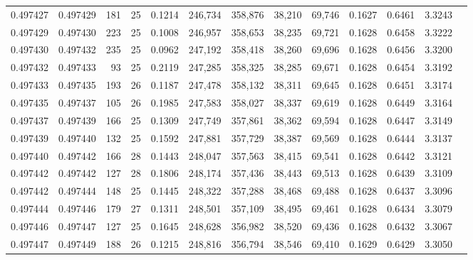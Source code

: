 \begin{tabular}{rrrrrrrrrrrrr}
0.497427 & 0.497429 & 181 &  25 &                                     0.1214 & 246,734 & 358,876 &  38,210 &  69,746 & 0.1627 & 0.6461 & 3.3243 \\
0.497429 & 0.497430 & 223 &  25 &                                     0.1008 & 246,957 & 358,653 &  38,235 &  69,721 & 0.1628 & 0.6458 & 3.3222 \\
0.497430 & 0.497432 & 235 &  25 &                                     0.0962 & 247,192 & 358,418 &  38,260 &  69,696 & 0.1628 & 0.6456 & 3.3200 \\
0.497432 & 0.497433 &  93 &  25 &                                     0.2119 & 247,285 & 358,325 &  38,285 &  69,671 & 0.1628 & 0.6454 & 3.3192 \\
0.497433 & 0.497435 & 193 &  26 &                                     0.1187 & 247,478 & 358,132 &  38,311 &  69,645 & 0.1628 & 0.6451 & 3.3174 \\
0.497435 & 0.497437 & 105 &  26 &                                     0.1985 & 247,583 & 358,027 &  38,337 &  69,619 & 0.1628 & 0.6449 & 3.3164 \\
0.497437 & 0.497439 & 166 &  25 &                                     0.1309 & 247,749 & 357,861 &  38,362 &  69,594 & 0.1628 & 0.6447 & 3.3149 \\
0.497439 & 0.497440 & 132 &  25 &                                     0.1592 & 247,881 & 357,729 &  38,387 &  69,569 & 0.1628 & 0.6444 & 3.3137 \\
0.497440 & 0.497442 & 166 &  28 &                                     0.1443 & 248,047 & 357,563 &  38,415 &  69,541 & 0.1628 & 0.6442 & 3.3121 \\
0.497442 & 0.497442 & 127 &  28 &                                     0.1806 & 248,174 & 357,436 &  38,443 &  69,513 & 0.1628 & 0.6439 & 3.3109 \\
0.497442 & 0.497444 & 148 &  25 &                                     0.1445 & 248,322 & 357,288 &  38,468 &  69,488 & 0.1628 & 0.6437 & 3.3096 \\
0.497444 & 0.497446 & 179 &  27 &                                     0.1311 & 248,501 & 357,109 &  38,495 &  69,461 & 0.1628 & 0.6434 & 3.3079 \\
0.497446 & 0.497447 & 127 &  25 &                                     0.1645 & 248,628 & 356,982 &  38,520 &  69,436 & 0.1628 & 0.6432 & 3.3067 \\
0.497447 & 0.497449 & 188 &  26 &                                     0.1215 & 248,816 & 356,794 &  38,546 &  69,410 & 0.1629 & 0.6429 & 3.3050 \\

\end{tabular}
